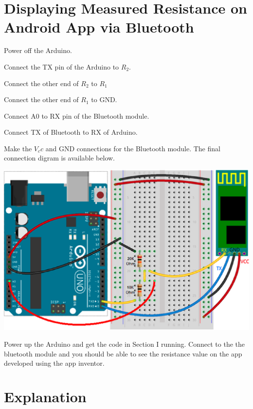 \documentclass[journal,12pt,twocolumn]{IEEEtran}
\begin{document}
\section{Displaying Measured Resistance on Android App via Bluetooth}
Power off the Arduino.
\begin{problem}
Connect the TX pin of the Arduino to $R_2$.
\end{problem}
\begin{problem}
Connect the other end of $R_2$ to $R_1$
\end{problem}
\begin{problem}
Connect the other end of $R_1$ to GND.
\end{problem}
%
\begin{problem}
Connect A0 to RX pin of the Bluetooth module.
\end{problem}
%
\begin{problem}
Connect TX of Bluetooth to RX of Arduino.
\end{problem}
%
\begin{problem}
Make the $V_cc$ and GND connections for the Bluetooth module.  The final connection digram is available below.
\end{problem}
%
\includegraphics[width=\columnwidth]{./figs/Bluetooth-Module-Arduino-Uno.eps}
\begin{problem}
Power up the Arduino and get the code in Section I running.  Connect to the the bluetooth module and you should be able to see the resistance value on the app developed using the app inventor.
\end{problem}
%
\section{Explanation}
\end{document}
